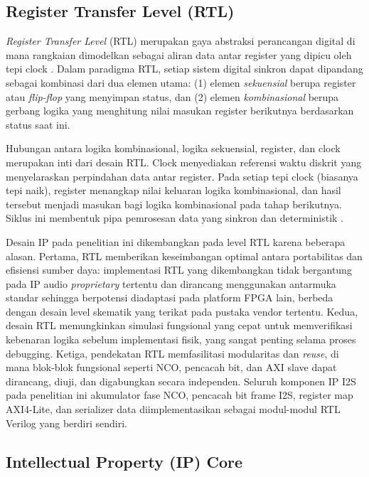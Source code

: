 \subsection{Register Transfer Level (RTL)}

\textit{Register Transfer Level} (RTL) merupakan gaya abstraksi perancangan digital di mana rangkaian dimodelkan sebagai aliran data antar register yang dipicu oleh tepi clock \citep{harris_harris_digital_2022}. Dalam paradigma RTL, setiap sistem digital sinkron dapat dipandang sebagai kombinasi dari dua elemen utama: (1) elemen \textit{sekuensial} berupa register atau \textit{flip-flop} yang menyimpan status, dan (2) elemen \textit{kombinasional} berupa gerbang logika yang menghitung nilai masukan register berikutnya berdasarkan status saat ini.

Hubungan antara logika kombinasional, logika sekuensial, register, dan clock merupakan inti dari desain RTL. Clock menyediakan referensi waktu diskrit yang menyelaraskan perpindahan data antar register. Pada setiap tepi clock (biasanya tepi naik), register menangkap nilai keluaran logika kombinasional, dan hasil tersebut menjadi masukan bagi logika kombinasional pada tahap berikutnya. Siklus ini membentuk pipa pemrosesan data yang sinkron dan deterministik \citep{palnitkar_verilog_2003}.

Desain IP pada penelitian ini dikembangkan pada level RTL karena beberapa alasan. Pertama, RTL memberikan keseimbangan optimal antara portabilitas dan efisiensi sumber daya: implementasi RTL yang dikembangkan tidak bergantung pada IP audio \textit{proprietary} tertentu dan dirancang menggunakan antarmuka standar sehingga berpotensi diadaptasi pada platform FPGA lain, berbeda dengan desain level skematik yang terikat pada pustaka vendor tertentu. Kedua, desain RTL memungkinkan simulasi fungsional yang cepat untuk memverifikasi kebenaran logika sebelum implementasi fisik, yang sangat penting selama proses debugging. Ketiga, pendekatan RTL memfasilitasi modularitas dan \textit{reuse}, di mana blok-blok fungsional seperti NCO, pencacah bit, dan AXI slave dapat dirancang, diuji, dan digabungkan secara independen. Seluruh komponen IP I2S pada penelitian ini  akumulator fase NCO, pencacah bit frame I2S, register map AXI4-Lite, dan serializer data  diimplementasikan sebagai modul-modul RTL Verilog yang berdiri sendiri.

\subsection{Intellectual Property (IP) Core}

